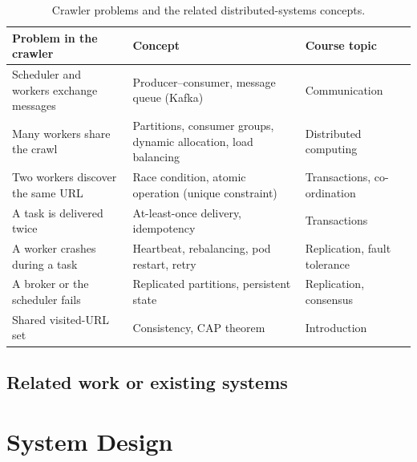\begin{table}[H]
\centering
\begin{tabular}{|p{5.2cm}|p{5.2cm}|p{3.2cm}|}
\hline
\textbf{Problem in the crawler} & \textbf{Concept} & \textbf{Course topic} \\
\hline
Scheduler and workers exchange messages & Producer--consumer, message queue (Kafka) & Communication \\
\hline
Many workers share the crawl & Partitions, consumer groups, dynamic allocation, load balancing & Distributed computing \\
\hline
Two workers discover the same URL & Race condition, atomic operation (unique constraint) & Transactions, co-ordination \\
\hline
A task is delivered twice & At-least-once delivery, idempotency & Transactions \\
\hline
A worker crashes during a task & Heartbeat, rebalancing, pod restart, retry & Replication, fault tolerance \\
\hline
A broker or the scheduler fails & Replicated partitions, persistent state & Replication, consensus \\
\hline
Shared visited-URL set & Consistency, CAP theorem & Introduction \\
\hline
\end{tabular}
\caption{Crawler problems and the related distributed-systems concepts.}
\label{tab:concepts}
\end{table}




\subsection{Related work or existing systems}










\newpage
\section{System Design}


